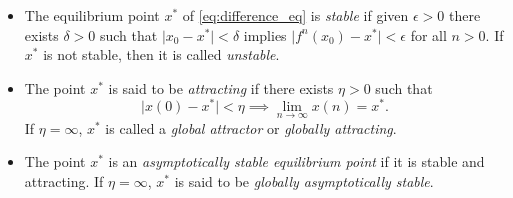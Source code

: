 \documentclass[12pt]{article}
\begin{document}
\begin{itemize}
    \item [(a)] The equilibrium point \(x^*\) of \eqref{eq:difference_eq} is \emph{stable} if given \(\epsilon > 0\) there exists \(\delta > 0\) such that \(\vert x_0 - x^* \vert < \delta\) implies \(\vert f^n(x_0) - x^* \vert < \epsilon\) for all \(n > 0\). If \(x^*\) is not stable, then it is called \emph{unstable}.
    \item [(b)] The point \(x^*\) is said to be \emph{attracting} if there exists \(\eta > 0\) such that \[\vert x(0) - x^* \vert < \eta \implies \lim_{n\to\infty} x(n) = x^*.\] If \(\eta = \infty\), \(x^*\) is called a \emph{global attractor} or \emph{globally attracting}.
    \item [(c)] The point \(x^*\) is an \emph{asymptotically stable equilibrium point} if it is stable and attracting. If \(\eta = \infty\), \(x^*\) is said to be \emph{globally asymptotically stable}.
\end{itemize}
\end{document}
